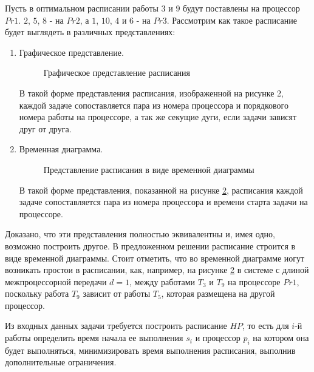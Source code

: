 Пусть в оптимальном расписании работы $3$ и $9$ будут поставлены на процессор $Pr1$. $2$, $5$, $8$ - на $Pr2$, а $1$, $10$, $4$ и $6$ - на $Pr3$. Рассмотрим как такое расписание будет выглядеть в различных представлениях:
\begin{enumerate}
    \item Графическое представление.

          \begin{figure}[!htbp]
              \caption{Графическое представление расписания}
              \label{fig:graphical-form}
          \end{figure}
          В такой форме представления расписания, изображенной на рисунке 2, каждой задаче сопоставляется пара из номера процессора и порядкового номера работы на процессоре, а так же секущие дуги, если задачи зависят друг от друга.
    \item Временная диаграмма.

          \begin{figure}[!htbp]
              \caption{Представление расписания в виде временной диаграммы}
              \label{fig:time-diagram}
          \end{figure}


          В такой форме представления, показанной на рисунке \ref{fig:time-diagram}, расписания каждой задаче сопоставляется пара из номера процессора и времени старта задачи на процессоре.
\end{enumerate}
Доказано, что эти представления полностью эквивалентны и, имея одно, возможно построить другое. В предложенном решении расписание строится в виде временной диаграммы. Стоит отметить, что во временной диаграмме иогут возникать простои в расписании, как, например, на рисунке \ref{fig:time-diagram} в системе с длиной межпроцессорной передачи $d=1$, между работами $T_3$ и $T_9$ на процессоре $Pr1$, поскольку работа $T_9$ зависит от работы $T_5$, которая размещена на другой процессор.

Из входных данных задачи требуется построить расписание $HP$, то есть для $i$-й работы определить время начала ее выполнения $s_i$ и процессор $p_i$ на котором она будет выполняться, минимизировать время выполнения расписания, выполнив дополнительные ограничения.


